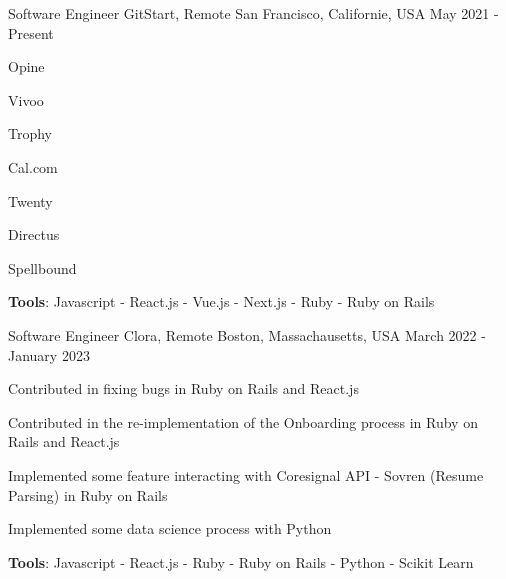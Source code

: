 

\begin{cventries}

  \cventry
    {Software Engineer} %
    {GitStart, Remote} %
    {San Francisco, Californie, USA} %
    {May 2021 - Present} %
    {
      \begin{cvitems} %
        \item {Opine}
        \item {Vivoo}
        \item {Trophy}
        \item {Cal.com}
        \item {Twenty}
        \item {Directus}
        \item {Spellbound}
        \item {\textbf{Tools}: Javascript - React.js - Vue.js - Next.js - Ruby - Ruby on Rails}
      \end{cvitems}
    }

  \cventry
    {Software Engineer} %
    {Clora, Remote} %
    {Boston, Massachausetts, USA} %
    {March 2022 - January 2023} %
    {
      \begin{cvitems} %
        \item {Contributed in fixing bugs in Ruby on Rails and React.js}
        \item {Contributed in the re-implementation of the Onboarding process in Ruby on Rails and React.js}
        \item {Implemented some feature interacting with Coresignal API - Sovren (Resume Parsing) in Ruby on Rails}
        \item {Implemented some data science process with Python}
        \item {\textbf{Tools}: Javascript - React.js - Ruby - Ruby on Rails - Python - Scikit Learn}
      \end{cvitems}
    }


\end{cventries}
